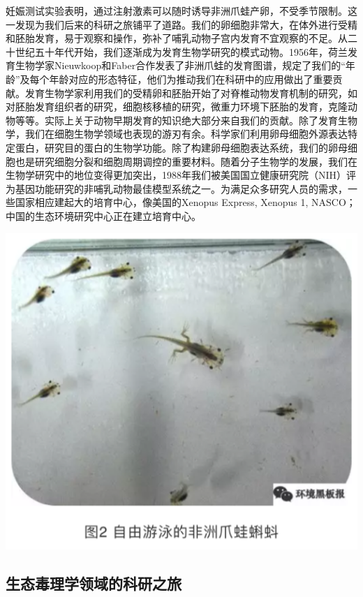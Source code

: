 \documentclass[
]{book}
\begin{document}
妊娠测试实验表明，通过注射激素可以随时诱导非洲爪蛙产卵，不受季节限制。这一发现为我们后来的科研之旅铺平了道路。我们的卵细胞非常大，在体外进行受精和胚胎发育，易于观察和操作，弥补了哺乳动物子宫内发育不宜观察的不足。从二十世纪五十年代开始，我们逐渐成为发育生物学研究的模式动物。1956年，荷兰发育生物学家Nieuwkoop和Faber合作发表了非洲爪蛙的发育图谱，规定了我们的``年龄''及每个年龄对应的形态特征，他们为推动我们在科研中的应用做出了重要贡献。发育生物学家利用我们的受精卵和胚胎开始了对脊椎动物发育机制的研究，如对胚胎发育组织者的研究，细胞核移植的研究，微重力环境下胚胎的发育，克隆动物等等。实际上关于动物早期发育的知识绝大部分来自我们的贡献。除了发育生物学，我们在细胞生物学领域也表现的游刃有余。科学家们利用卵母细胞外源表达特定蛋白，研究目的蛋白的生物学功能。除了构建卵母细胞表达系统，我们的卵母细胞也是研究细胞分裂和细胞周期调控的重要材料。随着分子生物学的发展，我们在生物学研究中的地位变得更加突出，1988年我们被美国国立健康研究院（NIH）评为基因功能研究的非哺乳动物最佳模型系统之一。为满足众多研究人员的需求，一些国家相应建起大的培育中心，像美国的Xenopus Express, Xenopus 1, NASCO；中国的生态环境研究中心正在建立培育中心。

\includegraphics[width=6.67in]{images/qingwa2}

\hypertarget{ux751fux6001ux6bd2ux7406ux5b66ux9886ux57dfux7684ux79d1ux7814ux4e4bux65c5}{%
\subsection{生态毒理学领域的科研之旅}\label{ux751fux6001ux6bd2ux7406ux5b66ux9886ux57dfux7684ux79d1ux7814ux4e4bux65c5}}
\end{document}
